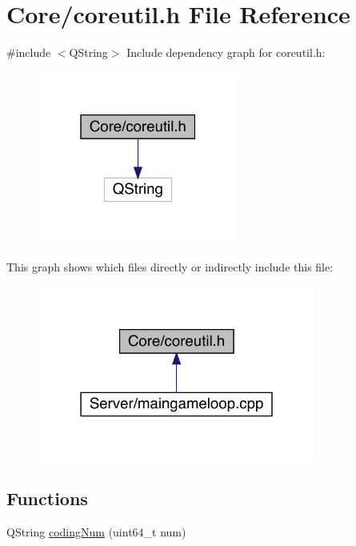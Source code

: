 \hypertarget{a00023}{}\section{Core/coreutil.h File Reference}
\label{a00023}
{\ttfamily \#include $<$Q\+String$>$}\newline
Include dependency graph for coreutil.\+h\+:
\nopagebreak
\begin{figure}[H]
\begin{center}
\leavevmode
\includegraphics[width=187pt]{dc/de2/a00024}
\end{center}
\end{figure}
This graph shows which files directly or indirectly include this file\+:
\nopagebreak
\begin{figure}[H]
\begin{center}
\leavevmode
\includegraphics[width=259pt]{d3/dfe/a00025}
\end{center}
\end{figure}
\subsection*{Functions}
\begin{DoxyCompactItemize}
\item 
Q\+String \hyperlink{a00023_ac67899e626a301d63a108c03193ca4e1}{coding\+Num} (uint64\+\_\+t num)
\end{DoxyCompactItemize}
